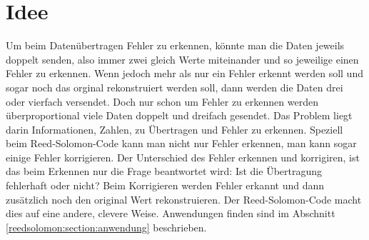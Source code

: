%
%
\section{Idee
\label{reedsolomon:section:idee}}
Um beim Datenübertragen Fehler zu erkennen, könnte man die Daten jeweils doppelt senden,
    also immer zwei gleich Werte miteinander und so jeweilige einen Fehler zu erkennen.
Wenn jedoch mehr als nur ein Fehler erkennt werden soll und sogar noch das orginal rekonstruiert werden soll,
dann werden die Daten drei oder vierfach versendet.
Doch nur schon um Fehler zu erkennen werden überproportional viele Daten doppelt und dreifach gesendet.
Das Problem liegt darin Informationen, Zahlen, 
    zu Übertragen und Fehler zu erkennen.
Speziell beim Reed-Solomon-Code kann man nicht nur Fehler erkennen, 
    man kann sogar einige Fehler korrigieren.
Der Unterschied des Fehler erkennen und korrigiren, ist das beim Erkennen nur die Frage beantwortet wird: Ist die Übertragung fehlerhaft oder nicht?
Beim Korrigieren werden Fehler erkannt und dann zusätzlich noch den original Wert rekonstruieren.
Der Reed-Solomon-Code macht dies auf eine andere, clevere Weise.
Anwendungen finden sind im Abschnitt 
\ref{reedsolomon:section:anwendung} beschrieben.

